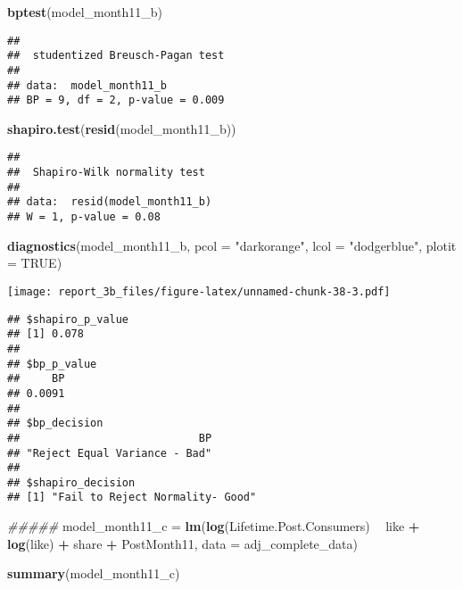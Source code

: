 \documentclass[
]{article}
\newenvironment{Shaded}{\begin{snugshade}}{\end{snugshade}}
\newcommand{\CommentTok}[1]{\textcolor[rgb]{0.56,0.35,0.01}{\textit{#1}}}
\newcommand{\DataTypeTok}[1]{\textcolor[rgb]{0.13,0.29,0.53}{#1}}
\newcommand{\KeywordTok}[1]{\textcolor[rgb]{0.13,0.29,0.53}{\textbf{#1}}}
\newcommand{\NormalTok}[1]{#1}
\newcommand{\OperatorTok}[1]{\textcolor[rgb]{0.81,0.36,0.00}{\textbf{#1}}}
\newcommand{\OtherTok}[1]{\textcolor[rgb]{0.56,0.35,0.01}{#1}}
\newcommand{\StringTok}[1]{\textcolor[rgb]{0.31,0.60,0.02}{#1}}
\begin{document}
\begin{Shaded}
\begin{Highlighting}[]
\KeywordTok{bptest}\NormalTok{(model_month11_b)}
\end{Highlighting}
\end{Shaded}

\begin{verbatim}
## 
##  studentized Breusch-Pagan test
## 
## data:  model_month11_b
## BP = 9, df = 2, p-value = 0.009
\end{verbatim}

\begin{Shaded}
\begin{Highlighting}[]
\KeywordTok{shapiro.test}\NormalTok{(}\KeywordTok{resid}\NormalTok{(model_month11_b))}
\end{Highlighting}
\end{Shaded}

\begin{verbatim}
## 
##  Shapiro-Wilk normality test
## 
## data:  resid(model_month11_b)
## W = 1, p-value = 0.08
\end{verbatim}

\begin{Shaded}
\begin{Highlighting}[]
\KeywordTok{diagnostics}\NormalTok{(model_month11_b, }\DataTypeTok{pcol =} \StringTok{"darkorange"}\NormalTok{, }\DataTypeTok{lcol =} \StringTok{"dodgerblue"}\NormalTok{, }\DataTypeTok{plotit =} \OtherTok{TRUE}\NormalTok{)}
\end{Highlighting}
\end{Shaded}

\texttt{[image: report\_3b\_files/figure-latex/unnamed-chunk-38-3.pdf]}

\begin{verbatim}
## $shapiro_p_value
## [1] 0.078
## 
## $bp_p_value
##     BP 
## 0.0091 
## 
## $bp_decision
##                            BP 
## "Reject Equal Variance - Bad" 
## 
## $shapiro_decision
## [1] "Fail to Reject Normality- Good"
\end{verbatim}

\begin{Shaded}
\begin{Highlighting}[]
\CommentTok{#####}
\NormalTok{model_month11_c =}\StringTok{ }\KeywordTok{lm}\NormalTok{(}\KeywordTok{log}\NormalTok{(Lifetime.Post.Consumers) }\OperatorTok{~}\StringTok{ }\NormalTok{like }\OperatorTok{+}\StringTok{ }\KeywordTok{log}\NormalTok{(like)  }\OperatorTok{+}\StringTok{ }\NormalTok{share }
                 \OperatorTok{+}\StringTok{ }\NormalTok{PostMonth11, }\DataTypeTok{data =}\NormalTok{ adj_complete_data)}

\KeywordTok{summary}\NormalTok{(model_month11_c)}
\end{Highlighting}
\end{Shaded}
\end{document}
